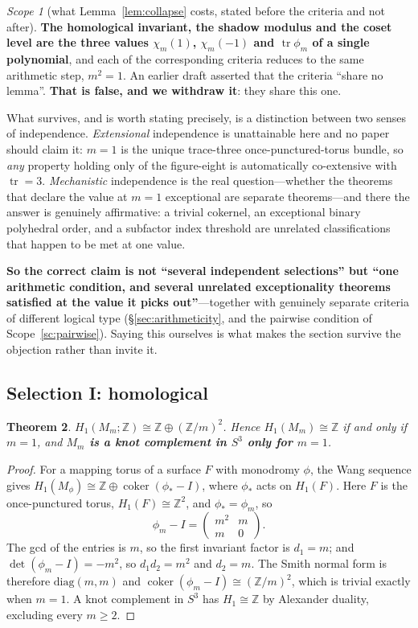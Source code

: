 \documentclass[11pt,reqno]{amsart}
\theoremstyle{plain}
\newtheorem{theorem}{Theorem}[section]
\theoremstyle{definition}
\theoremstyle{remark}
\newtheorem{scope}[theorem]{Scope}
\newcommand{\Z}{\mathbb{Z}}
\newcommand{\coker}{\operatorname{coker}}
\begin{document}
\begin{scope}[what Lemma~\ref{lem:collapse} costs, stated before the criteria and not after]\label{sc:collapse}
\textbf{The homological invariant, the shadow modulus and the coset level are the three
values $\chi_m(1)$, $\chi_m(-1)$ and $\operatorname{tr}\phi_m$ of a single polynomial},
and each of the corresponding criteria reduces to the same arithmetic step, $m^2=1$.
An earlier draft asserted that the criteria ``share no lemma''. \textbf{That is false,
and we withdraw it}: they share this one.

What survives, and is worth stating precisely, is a distinction between two senses of
independence. \emph{Extensional} independence is unattainable here and no paper should
claim it: $m=1$ is the unique trace-three once-punctured-torus bundle, so \emph{any}
property holding only of the figure-eight is automatically co-extensive with
$\operatorname{tr}=3$. \emph{Mechanistic} independence is the real question---whether the
theorems that declare the value at $m=1$ exceptional are separate theorems---and there
the answer is genuinely affirmative: a trivial cokernel, an exceptional binary
polyhedral order, and a subfactor index threshold are unrelated classifications that
happen to be met at one value.

\textbf{So the correct claim is not ``several independent selections'' but ``one
arithmetic condition, and several unrelated exceptionality theorems satisfied at the
value it picks out''}---together with genuinely separate criteria of different logical
type (\S\ref{sec:arithmeticity}, and the pairwise condition of Scope~\ref{sc:pairwise}).
Saying this ourselves is what makes the section survive the objection rather than invite
it.
\end{scope}

\subsection{Selection I: homological}\label{sec:homological}

\begin{theorem}\label{thm:homology}
$H_1(M_m;\Z)\cong\Z\oplus(\Z/m)^2$. Hence $H_1(M_m)\cong\Z$ if and only if $m=1$, and
\textbf{$M_m$ is a knot complement in $S^3$ only for $m=1$}.
\end{theorem}

\begin{proof}
For a mapping torus of a surface $F$ with monodromy $\phi$, the Wang sequence gives
$H_1(M_\phi)\cong\Z\oplus\coker(\phi_*-I)$, where $\phi_*$ acts on $H_1(F)$. Here $F$ is
the once-punctured torus, $H_1(F)\cong\Z^2$, and $\phi_*=\phi_m$, so
\[
   \phi_m-I=\begin{pmatrix}m^2&m\\m&0\end{pmatrix}.
\]
The gcd of the entries is $m$, so the first invariant factor is $d_1=m$; and
$\det(\phi_m-I)=-m^2$, so $d_1d_2=m^2$ and $d_2=m$. The Smith normal form is therefore
$\mathrm{diag}(m,m)$ and $\coker(\phi_m-I)\cong(\Z/m)^2$, which is trivial exactly when
$m=1$. A knot complement in $S^3$ has $H_1\cong\Z$ by Alexander duality, excluding every
$m\ge2$.
\end{proof}
\end{document}
